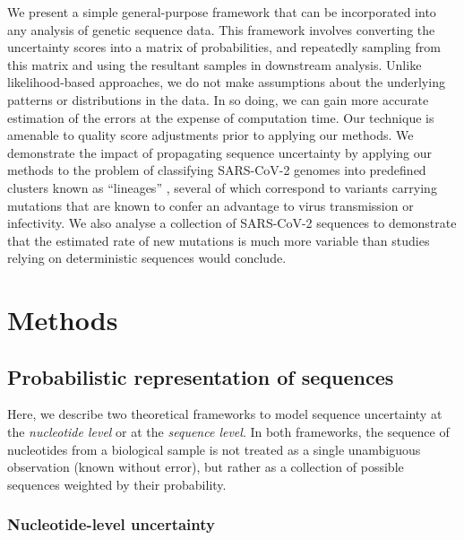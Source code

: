 \documentclass[12pt]{article}
\begin{document}
We present a simple general-purpose framework that can be incorporated into any analysis of genetic sequence data.
This framework involves converting the uncertainty scores into a matrix of probabilities, and repeatedly sampling from this matrix and using the resultant samples in downstream analysis.
Unlike likelihood-based approaches, we do not make assumptions about the underlying patterns or distributions in the data.
In so doing, we can gain more accurate estimation of the errors at the expense of computation time.
Our technique is amenable to quality score adjustments prior to applying our methods.
We demonstrate the impact of propagating sequence uncertainty by applying our methods to the problem of classifying SARS-CoV-2 genomes into predefined clusters known as ``lineages'' \citep{rambautDynamicNomenclatureProposal2020}, several of which correspond to variants carrying mutations that are known to confer an advantage to virus transmission or infectivity.
We also analyse a collection of SARS-CoV-2 sequences to demonstrate that the estimated rate of new mutations is much more variable than studies relying on deterministic sequences would conclude.



\section{Methods}

\subsection{Probabilistic representation of sequences}

Here, we describe two theoretical frameworks to model sequence uncertainty at the \emph{nucleotide level} or at the \emph{sequence level}.
In both frameworks, the sequence of nucleotides from a biological sample is not treated as a single unambiguous observation (known without error), but rather as a collection of possible sequences weighted by their probability.

\subsubsection{Nucleotide-level uncertainty}
\end{document}
